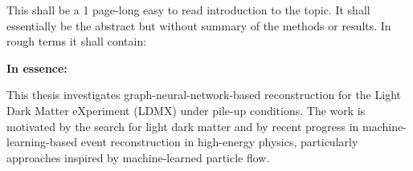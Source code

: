 
This shall be a 1 page-long easy to read introduction to the topic. It shall essentially be the abstract but without summary of the methods or results. In rough terms it shall contain:

\textbf{In essence:}

This thesis investigates graph-neural-network-based reconstruction for the Light Dark Matter eXperiment (LDMX) under pile-up conditions. The work is motivated by the search for light dark matter and by recent progress in machine-learning-based event reconstruction in high-energy physics, particularly approaches inspired by machine-learned particle flow.
